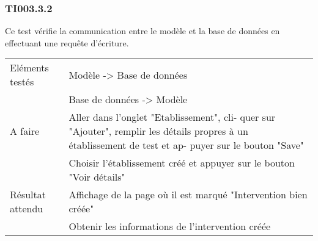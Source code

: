   		
  	\subsubsection{TI003.3.2}
  	\label{TI003.3.2}
  		Ce test vérifie la communication entre le modèle et la base de données en effectuant une requête d'écriture.
  		\begin{center}
    	 		\begin{tabular}[h]{|p{}|p{}|}
			\hline
				Eléments testés & Modèle -> Base de données  \\
							    &  Base de données -> Modèle \\\hline
    				A faire & Aller dans l’onglet "Etablissement", cli-
quer sur "Ajouter", remplir les détails
propres à un établissement de test et ap-
puyer sur le bouton "Save" \\
    						& Choisir l’établissement créé et appuyer
sur le bouton "Voir détails"\\\hline
    				Résultat attendu & Affichage de la page où il est marqué "Intervention bien créée" \\
    								 & Obtenir les informations de l'intervention créée \\\hline
     		\end{tabular}
  		\end{center}	
  		